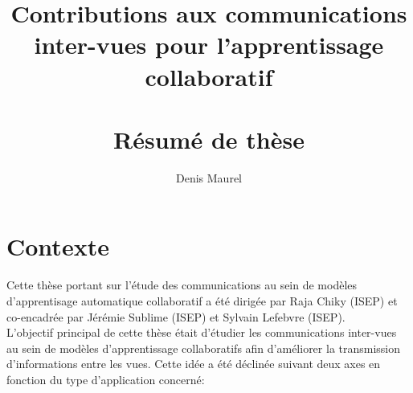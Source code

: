 \documentclass[a4paper]{article}
\begin{document}
\title{Contributions aux communications inter-vues pour l'apprentissage collaboratif\\~\\
\large Résumé de thèse}
\author{Denis Maurel}
\date{}

\maketitle

\section{Contexte}
Cette thèse portant sur l'étude des communications au sein de modèles d'apprentisage automatique collaboratif a été dirigée par Raja Chiky (ISEP) et co-encadrée par Jérémie Sublime (ISEP) et Sylvain Lefebvre (ISEP).\\

L'objectif principal de cette thèse était d'étudier les communications inter-vues au sein de modèles d'apprentissage collaboratifs afin d'améliorer la transmission d'informations entre les vues. Cette idée a été déclinée suivant deux axes en fonction du type d'application concerné:\\
\end{document}
